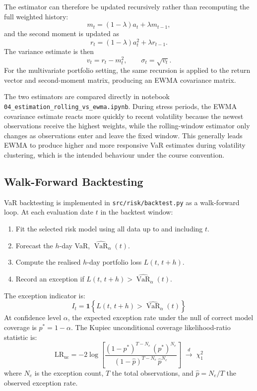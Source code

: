 \documentclass[11pt]{article}
\newcommand{\code}[1]{\texttt{#1}}
\DeclareMathOperator{\VaR}{VaR}
\begin{document}
The estimator can therefore be updated recursively rather than recomputing the
full weighted history:
\begin{equation}
  m_t = (1-\lambda)a_t + \lambda m_{t-1},
  \label{eq:ewma_mean_recursion}
\end{equation}
and the second moment is updated as
\begin{equation}
  r_t = (1-\lambda)a_t^2 + \lambda r_{t-1}.
  \label{eq:ewma_second_moment_recursion}
\end{equation}
The variance estimate is then
\begin{equation}
  v_t = r_t - m_t^2,
  \qquad
  \sigma_t = \sqrt{v_t}.
  \label{eq:ewma_variance}
\end{equation}
For the multivariate portfolio setting, the same recursion is applied to the
return vector and second-moment matrix, producing an EWMA covariance matrix.

The two estimators are compared directly in notebook
\code{04\_estimation\_rolling\_vs\_ewma.ipynb}.  During stress periods, the EWMA
covariance estimate reacts more quickly to recent volatility because the newest
observations receive the highest weights, while the rolling-window estimator
only changes as observations enter and leave the fixed window.  This generally
leads EWMA to produce higher and more responsive VaR estimates during volatility
clustering, which is the intended behaviour under the course convention.

\subsection{Walk-Forward Backtesting}

VaR backtesting is implemented in \code{src/risk/backtest.py} as a
walk-forward loop.  At each evaluation date $t$ in the backtest window:
\begin{enumerate}
  \item Fit the selected risk model using all data up to and including $t$.
  \item Forecast the $h$-day VaR, $\widehat{\VaR}_\alpha(t)$.
  \item Compute the realised $h$-day portfolio loss $L(t,\,t+h)$.
  \item Record an exception if $L(t,\,t+h) > \widehat{\VaR}_\alpha(t)$.
\end{enumerate}
The exception indicator is:
\begin{equation}
  I_t = \mathbf{1}\!\left\{L(t,\,t+h) > \widehat{\VaR}_\alpha(t)\right\}
  \label{eq:exception}
\end{equation}
At confidence level $\alpha$, the expected exception rate under the null of
correct model coverage is $p^* = 1 - \alpha$.  The Kupiec unconditional
coverage likelihood-ratio statistic is:
\begin{equation}
  \mathrm{LR}_{\mathrm{uc}}
    = -2\log\!\left[\frac{(1-p^*)^{T-N_e}\,(p^*)^{N_e}}
                        {(1-\hat{p})^{T-N_e}\,\hat{p}^{N_e}}\right]
    \;\xrightarrow{\;d\;}\; \chi^2_1
  \label{eq:kupiec}
\end{equation}
where $N_e$ is the exception count, $T$ the total observations, and
$\hat{p} = N_e/T$ the observed exception rate.
\end{document}
